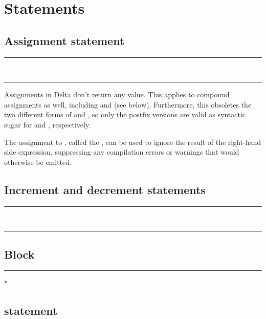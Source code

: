 
\chapter{Statements}

\section{Assignment statement}

\begin{grammar}
\rule{assignment-statement}  \code{=}  \code{;}\\
\rule{assignment-statement} \code{\_} \code{=}  \code{;}
\end{grammar}

Assignments in Delta don't return any value. This applies to compound
assignments as well, including \code{++} and \code{--} (see below). Furthermore,
this obsoletes the two different forms of \code{++} and \code{--}, so only the
postfix versions are valid as syntactic sugar for  and ,
respectively.

The assignment to \code{\_}, called the , can
be used to ignore the result of the right-hand side expression, suppressing any
compilation errors or warnings that would otherwise be emitted.

\section{Increment and decrement statements}

\begin{grammar}
\rule{increment-statement}  \code{++} \code{;}\\
\rule{decrement-statement}  \code{--} \code{;}
\end{grammar}

\section{Block}

\begin{grammar}
\rule{block} \code{\{} * \code{\}}
\end{grammar}

\section{ statement}

